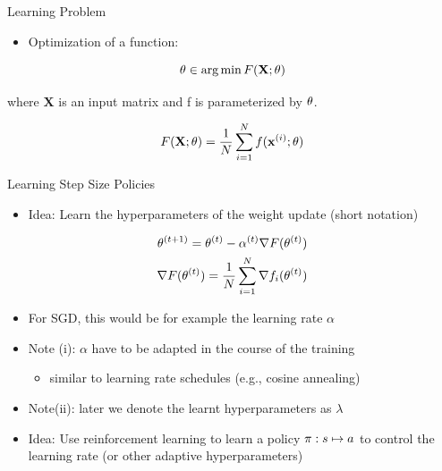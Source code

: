 	
\begin{frame}[c]{Learning Problem }


\begin{itemize}
	\item Optimization of a function:
\end{itemize}
\begin{equation}
	\theta \in \operatorname*{arg\,min} F(\mathbf{X}; \theta) \nonumber
\end{equation}

where $\mathbf{X}$ is an input matrix and f is parameterized by $\theta$.


\pause
\medskip

\begin{equation}
F(\mathbf{X}; \theta) = \frac{1}{N} \sum_{i=1}^N f(\mathbf{x}^{(i)}; \theta) \nonumber
\end{equation}




\end{frame}
\begin{frame}[c]{Learning Step Size Policies }

\begin{itemize}
\item \alert{Idea:} Learn the hyperparameters of the weight update (short notation)
\end{itemize} 

\begin{eqnarray}
\theta^{(t+1)} = \theta^{(t)} - \alpha^{(t)} \nabla F(\theta^{(t)}) \nonumber\\
\nabla F(\theta^{(t)}) = \frac{1}{N} \sum_{i=1}^N \nabla f_i(\theta^{(t)})\nonumber
\end{eqnarray}


\begin{itemize}
\pause
\item For SGD, this would be for example the learning rate $\alpha$
\pause
\item \alert{Note (i)}: $\alpha$ have to be adapted in the course of the training
\begin{itemize}
\item similar to learning rate schedules (e.g., cosine annealing)
\end{itemize}
\pause
\item \alert{Note(ii)}: later we denote the learnt hyperparameters as $\lambda$
\medskip
\pause
\item \alert{Idea:} Use reinforcement learning to learn a policy $\pi: s \mapsto a$ to control the learning rate (or other adaptive hyperparameters)
\end{itemize}



\end{frame}
